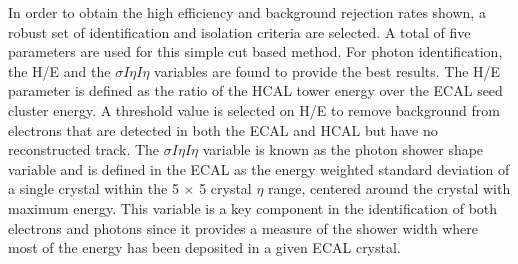 In order to obtain the high efficiency and background rejection rates shown, a robust set of identification and isolation criteria are selected. A total of five parameters are used for this simple cut based method. For photon identification, the H/E and the $\sigma I\eta I\eta$ variables are found to provide the best results. The H/E parameter is defined as the ratio of the HCAL tower energy over the ECAL seed cluster energy. A threshold value is selected on H/E to remove background from electrons that are detected in both the ECAL and HCAL but have no reconstructed track\cite{egamma}. The $\sigma I\eta I\eta$ variable is known as the photon shower shape variable and is defined in the ECAL as the energy weighted standard deviation of a single crystal within the 5 $\times$ 5 crystal $\eta$ range, centered around the crystal with maximum energy\cite{showershape}. This variable is a key component in the identification of both electrons and photons since it provides a measure of the shower width where most of the energy has been deposited in a given ECAL crystal.

